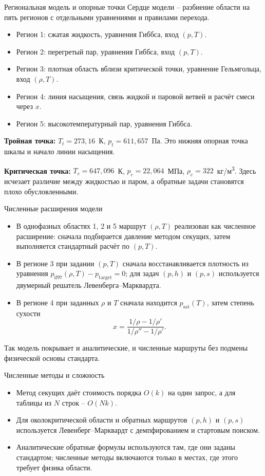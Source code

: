 \begin{frame}[t]{Региональная модель и опорные точки}
\small
Сердце модели -- разбиение области на пять регионов с отдельными уравнениями и правилами перехода.
\begin{itemize}
  \item Регион 1: сжатая жидкость, уравнения Гиббса, вход \((p,T)\).
  \item Регион 2: перегретый пар, уравнения Гиббса, вход \((p,T)\).
  \item Регион 3: плотная область вблизи критической точки, уравнение Гельмгольца, вход \((\rho,T)\).
  \item Регион 4: линия насыщения, связь жидкой и паровой ветвей и расчёт смеси через \(x\).
  \item Регион 5: высокотемпературный пар, уравнения Гиббса.
\end{itemize}
\textbf{Тройная точка:} \(T_t=273{,}16\)~К, \(p_t=611{,}657\)~Па. Это нижняя опорная точка шкалы и начало линии насыщения.

\textbf{Критическая точка:} \(T_c=647{,}096\)~К, \(p_c=22{,}064\)~МПа, \(\rho_c=322\)~кг/м\textsuperscript{3}. Здесь исчезает различие между жидкостью и паром, а обратные задачи становятся плохо обусловленными.
\end{frame}

\begin{frame}[t]{Численные расширения модели}
\small
\begin{itemize}
  \item В однофазных областях 1, 2 и 5 маршрут \((\rho,T)\) реализован как численное расширение: сначала подбирается давление методом секущих, затем выполняется стандартный расчёт по \((p,T)\).
  \item В регионе 3 при задании \((p,T)\) сначала восстанавливается плотность из уравнения \(p_{\mathrm{if97}}(\rho,T)-p_{\mathrm{target}}=0\); для задач \((p,h)\) и \((p,s)\) используется двумерный решатель Левенберга--Марквардта.
  \item В регионе 4 при заданных \(\rho\) и \(T\) сначала находится \(p_{\mathrm{sat}}(T)\), затем степень сухости
  \[
  x=\frac{1/\rho-1/\rho'}{1/\rho''-1/\rho'}.
  \]
\end{itemize}
Так модель покрывает и аналитические, и численные маршруты без подмены физической основы стандарта.
\end{frame}

\begin{frame}[t]{Численные методы и сложность}
\small
\begin{itemize}
  \item Метод секущих даёт стоимость порядка \(O(k)\) на один запрос, а для таблицы из \(N\) строк -- \(O(Nk)\).
  \item Для околокритической области и обратных маршрутов \((p,h)\) и \((p,s)\) используется Левенберг--Марквардт с демпфированием и стартовым поиском.
  \item Аналитические обратные формулы используются там, где они заданы стандартом; численные методы включаются только в местах, где этого требует физика области.
\end{itemize}
\end{frame}

